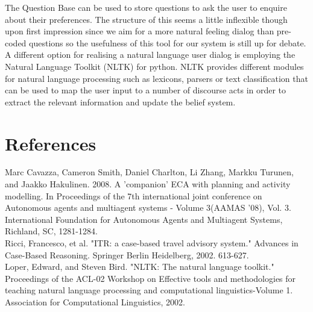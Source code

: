 \documentclass[11pt]{article} %
\begin{document}
The Question Base can be used to store questions to ask the user to enquire about their preferences. The structure of this seems a little inflexible though upon first impression since we aim for a more natural feeling dialog than pre-coded questions so the usefulness of this tool for our system is still up for debate.\\
A different option for realising a natural language user dialog is employing the Natural Language Toolkit (NLTK) for python. NLTK provides different modules for natural language processing such as lexicons, parsers or text classification that can be used to map the user input to a number of discourse acts in order to extract the relevant information and update the belief system.
\section{References}
Marc Cavazza, Cameron Smith, Daniel Charlton, Li Zhang, Markku Turunen, and Jaakko Hakulinen. 2008. A 'companion' ECA with planning and activity modelling. In Proceedings of the 7th international joint conference on Autonomous agents and multiagent systems - Volume 3(AAMAS '08), Vol. 3. International Foundation for Autonomous Agents and Multiagent Systems, Richland, SC, 1281-1284.\\
Ricci, Francesco, et al. "ITR: a case-based travel advisory system." Advances in Case-Based Reasoning. Springer Berlin Heidelberg, 2002. 613-627.\\
Loper, Edward, and Steven Bird. "NLTK: The natural language toolkit." Proceedings of the ACL-02 Workshop on Effective tools and methodologies for teaching natural language processing and computational linguistics-Volume 1. Association for Computational Linguistics, 2002.
\end{document}
